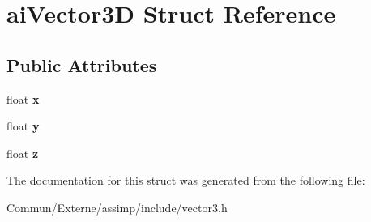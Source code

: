 \hypertarget{structai_vector3_d}{}\section{ai\+Vector3D Struct Reference}
\label{structai_vector3_d}
\subsection*{Public Attributes}
\begin{DoxyCompactItemize}
\item 
float {\bfseries x}\hypertarget{structai_vector3_d_a3762d39eeb99def9ebd413b2bb8dd470}{}\label{structai_vector3_d_a3762d39eeb99def9ebd413b2bb8dd470}

\item 
float {\bfseries y}\hypertarget{structai_vector3_d_ac7b5fcc03324f8c3bc8429c95882dfb8}{}\label{structai_vector3_d_ac7b5fcc03324f8c3bc8429c95882dfb8}

\item 
float {\bfseries z}\hypertarget{structai_vector3_d_a2b93b892064995e8d24f4e3352175aae}{}\label{structai_vector3_d_a2b93b892064995e8d24f4e3352175aae}

\end{DoxyCompactItemize}


The documentation for this struct was generated from the following file\+:\begin{DoxyCompactItemize}
\item 
Commun/\+Externe/assimp/include/vector3.\+h\end{DoxyCompactItemize}
